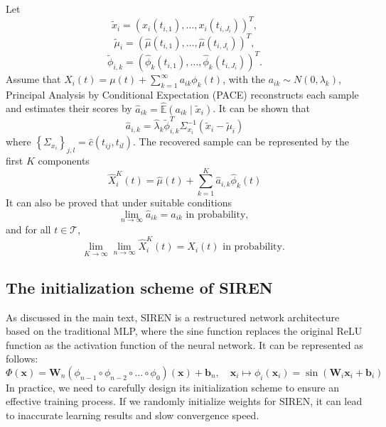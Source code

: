 \documentclass{article}
\begin{document}
Let 
$$\tilde{x}_i=\left(x_i\left(t_{i, 1}\right), \ldots, x_i\left(t_{i, J_i}\right)\right)^T, $$
$$\tilde{\mu}_i=\left(\widehat{\mu}\left(t_{i, 1}\right), \ldots, \widehat{\mu}\left(t_{i, J_i}\right)\right)^T, $$ 
$$\tilde{\phi}_{i, k}=\left(\widehat{\phi}_k\left(t_{i, 1}\right), \ldots, \widehat{\phi}_k\left(t_{i, J_i}\right)\right)^T.$$
Assume that $X_i(t)=\mu(t)+\sum_{k=1}^{\infty} a_{i k} \phi_k(t)$, with the $a_{i k} \sim N\left(0, \lambda_k\right)$,
Principal Analysis by Conditional Expectation (PACE) reconstructs each sample and estimates their scores by $\widehat{a}_{i k}=\hat{\mathbb{E}}\left(a_{i k} \mid \tilde{x}_i\right)$.
It can be shown that 
$$
\widehat{a}_{i, k}=\widehat{\lambda}_k \tilde{\phi}_{i, k}^T \Sigma_{x_i}^{-1}\left(\tilde{x}_i-\tilde{\mu}_i\right)
$$
where $\left\{\Sigma_{x_i}\right\}_{j, l}=\widehat{c}\left(t_{ij}, t_{il}\right)$.
The recovered sample can be represented by the first $K$ components 
$$\widehat{X}_i^K(t)=\widehat{\mu}(t)+\sum_{k=1}^K \widehat{a}_{i, k} \widehat{\phi}_k(t)$$
It can also be proved \cite{yao2005functional}  that under suitable conditions
$$
\lim _{n \rightarrow \infty} \hat{a}_{i k}={a}_{i k} \text { in probability, }
$$
and for all $t \in \mathcal{T}$,
$$
\lim _{K \rightarrow \infty} \lim _{n \rightarrow \infty} \widehat{X}_i^K(t)={X}_i(t) \text { in probability. }
$$


\subsection{The initialization scheme of SIREN \cite{sitzmann2020implicit}}

As discussed in the main text, SIREN is a restructured network architecture based on the traditional MLP, 
where the sine function replaces the original ReLU function as the activation function of the neural network. 
It can be represented as follows:
$$
\Phi(\mathbf{x})=\mathbf{W}_n\left(\phi_{n-1} \circ \phi_{n-2} \circ \ldots \circ \phi_0\right)(\mathbf{x})+\mathbf{b}_n, \quad \mathbf{x}_i \mapsto \phi_i\left(\mathbf{x}_i\right)=\sin \left(\mathbf{W}_i \mathbf{x}_i+\mathbf{b}_i\right)
$$
In practice, we need to carefully design its initialization scheme to ensure an effective training process. 
If we randomly initialize weights for SIREN, it can lead to inaccurate learning results and slow convergence speed.
\end{document}
